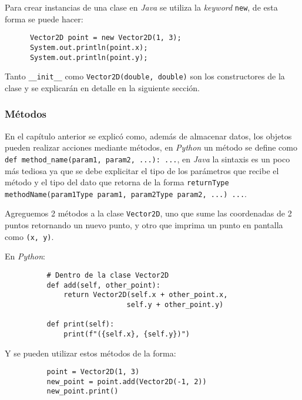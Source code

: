     Para crear instancias de una clase en \textit{Java} se utiliza la \textit{keyword} 
    \texttt{new}, de esta forma se puede hacer:

    \begin{verbatim}
      Vector2D point = new Vector2D(1, 3);
      System.out.println(point.x);
      System.out.println(point.y);
    \end{verbatim}

    Tanto \texttt{__init__} como \texttt{Vector2D(double, double)}
    son los constructores de la clase y se explicarán en detalle en la siguiente sección.

    \subsubsection{Métodos}
      \label{sec:methods}
      En el capítulo anterior se explicó como, además de almacenar datos, los objetos 
      pueden realizar acciones mediante métodos, en \textit{Python} un método se define 
      como \texttt{def method_name(param1, param2, ...): ...}, en 
      \textit{Java} la sintaxis es un poco más tediosa ya que se debe explicitar el tipo 
      de los parámetros que recibe el método y el tipo del dato que retorna de la forma
      \texttt{returnType methodName(param1Type param1, param2Type param2, ...) {...}}.

      Agreguemos 2 métodos a la clase \texttt{Vector2D}, uno que sume las coordenadas de 2
      puntos retornando un nuevo punto, y otro que imprima un punto en pantalla como 
      \texttt{(x, y)}.

      En \textit{Python}:
      \begin{listing}[ht!]
        \begin{verbatim}
          # Dentro de la clase Vector2D
          def add(self, other_point):
              return Vector2D(self.x + other_point.x,
                             self.y + other_point.y)
          
          def print(self):
              print(f"({self.x}, {self.y})")
        \end{verbatim}
      \end{listing}

      Y se pueden utilizar estos métodos de la forma:

      \begin{listing}[ht!]
        \begin{verbatim}
          point = Vector2D(1, 3)
          new_point = point.add(Vector2D(-1, 2))
          new_point.print()
        \end{verbatim}
      \end{listing}

